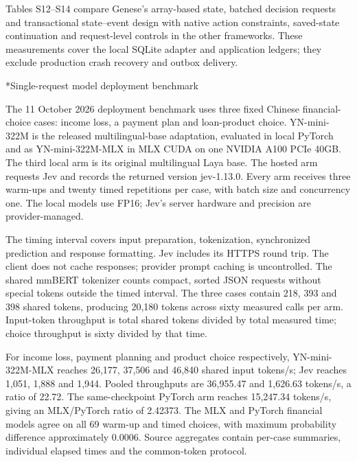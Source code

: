\documentclass[10pt]{article}
\makeatletter
\renewcommand\subsection{\@startsection{subsection}{2}{\z@}{-1.7ex plus -.5ex minus -.2ex}{.6ex plus .2ex}{\normalfont\normalsize\mdseries}}
\makeatother
\begin{document}
Tables S12--S14 compare Genese's array-based state, batched decision requests and transactional state--event design with native action constraints, saved-state continuation and request-level controls in the other frameworks. These measurements cover the local SQLite adapter and application ledgers; they exclude production crash recovery and outbox delivery.

\subsection*{Single-request model deployment benchmark}

The 11 October 2026 deployment benchmark uses three fixed Chinese financial-choice cases: income loss, a payment plan and loan-product choice. YN-mini-322M is the released multilingual-base adaptation, evaluated in local PyTorch and as YN-mini-322M-MLX in MLX CUDA on one NVIDIA A100 PCIe 40GB. The third local arm is its original multilingual Laya base. The hosted arm requests Jev and records the returned version jev-1.13.0. Every arm receives three warm-ups and twenty timed repetitions per case, with batch size and concurrency one. The local models use FP16; Jev's server hardware and precision are provider-managed.

The timing interval covers input preparation, tokenization, synchronized prediction and response formatting. Jev includes its HTTPS round trip. The client does not cache responses; provider prompt caching is uncontrolled. The shared mmBERT tokenizer counts compact, sorted JSON requests without special tokens outside the timed interval. The three cases contain 218, 393 and 398 shared tokens, producing 20,180 tokens across sixty measured calls per arm. Input-token throughput is total shared tokens divided by total measured time; choice throughput is sixty divided by that time.

For income loss, payment planning and product choice respectively, YN-mini-322M-MLX reaches 26,177, 37,506 and 46,840 shared input tokens/s; Jev reaches 1,051, 1,888 and 1,944. Pooled throughputs are 36,955.47 and 1,626.63 tokens/s, a ratio of 22.72. The same-checkpoint PyTorch arm reaches 15,247.34 tokens/s, giving an MLX/PyTorch ratio of 2.42373. The MLX and PyTorch financial models agree on all 69 warm-up and timed choices, with maximum probability difference approximately 0.0006. Source aggregates contain per-case summaries, individual elapsed times and the common-token protocol.
\end{document}
